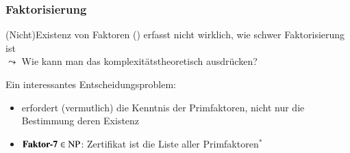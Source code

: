 \documentclass[aspectratio=1610,onlymath]{beamer}
\begin{document}
\begin{frame}\frametitle{Faktorisierung}

(Nicht)Existenz von Faktoren () erfasst nicht wirklich,
wie schwer Faktorisierung ist\\
$\leadsto$ Wie kann man das komplexitätstheoretisch ausdrücken?
\medskip\pause

\pause

Ein interessantes Entscheidungsproblem:
\begin{itemize}
\item {} erfordert (vermutlich) die Kenntnis der Primfaktoren, nicht nur
die Bestimmung deren Existenz\pause
\item $\textbf{\textcolor{black}{Faktor-7}}\in{\textsc{NP}}$\pause: Zertifikat ist die Liste aller Primfaktoren${}^*$
\end{itemize}


\end{frame}
\end{document}
